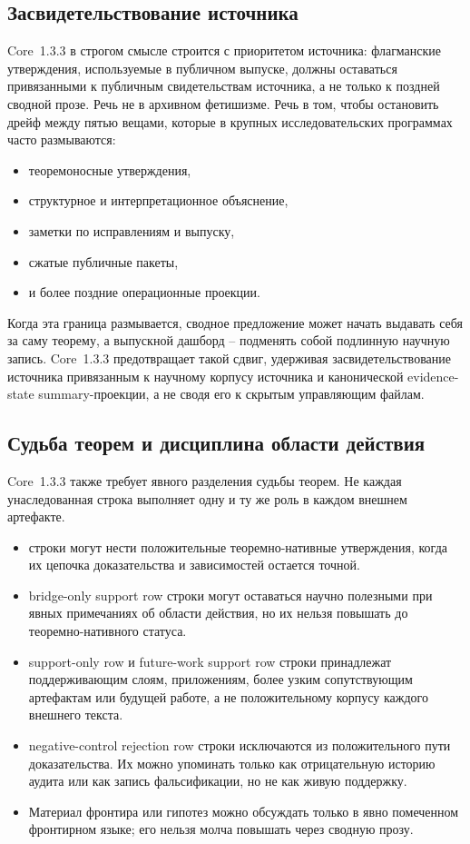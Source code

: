\subsection{Засвидетельствование источника}

Core~1.3.3 в строгом смысле строится с приоритетом источника: флагманские
утверждения, используемые в публичном выпуске, должны оставаться привязанными
к публичным свидетельствам источника, а не только к поздней сводной прозе.
Речь не в архивном фетишизме. Речь в том, чтобы остановить дрейф между пятью
вещами, которые в крупных исследовательских программах часто размываются:

\begin{itemize}
\item теоремоносные утверждения,
\item структурное и интерпретационное объяснение,
\item заметки по исправлениям и выпуску,
\item сжатые публичные пакеты,
\item и более поздние операционные проекции.
\end{itemize}

Когда эта граница размывается, сводное предложение может начать выдавать себя
за саму теорему, а выпускной дашборд -- подменять собой подлинную научную
запись. Core~1.3.3 предотвращает такой сдвиг, удерживая засвидетельствование
источника привязанным к научному корпусу источника и канонической
evidence-state summary-проекции, а не сводя его к скрытым управляющим файлам.

\subsection{Судьба теорем и дисциплина области действия}

Core~1.3.3 также требует явного разделения судьбы теорем. Не каждая унаследованная
строка выполняет одну и ту же роль в каждом внешнем артефакте.

\begin{itemize}
\item {} строки могут нести положительные
      теоремно-нативные утверждения, когда их цепочка доказательства и
      зависимостей остается точной.
\item bridge-only support row строки могут оставаться научно полезными при явных
      примечаниях об области действия, но их нельзя повышать до
      теоремно-нативного статуса.
\item support-only row и future-work support row строки принадлежат
      поддерживающим слоям, приложениям, более узким сопутствующим артефактам
      или будущей работе, а не положительному корпусу каждого внешнего текста.
\item negative-control rejection row строки исключаются из положительного пути доказательства.
      Их можно упоминать только как отрицательную историю аудита или как запись
      фальсификации, но не как живую поддержку.
\item Материал фронтира или гипотез можно обсуждать только в явно помеченном
      фронтирном языке; его нельзя молча повышать через сводную прозу.
\end{itemize}

